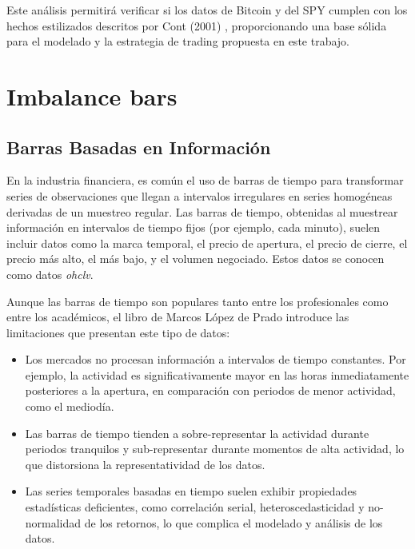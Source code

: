 \documentclass[a4paper,12pt]{report}
\begin{document}

Este análisis permitirá verificar si los datos de Bitcoin y del SPY cumplen con los hechos estilizados 
descritos por Cont (2001) \cite{Cont2001}, proporcionando una base sólida para el modelado y la estrategia 
de trading propuesta en este trabajo.

\chapter{Imbalance bars}

\section{Barras Basadas en Información}

En la industria financiera, es común el uso de barras de tiempo para transformar 
series de observaciones que llegan a intervalos irregulares en series homogéneas 
derivadas de un muestreo regular. Las barras de tiempo, obtenidas al muestrear 
información en intervalos de tiempo fijos (por ejemplo, cada minuto), suelen incluir 
datos como la marca temporal, el precio de apertura, el precio de cierre, el precio 
más alto, el más bajo, y el volumen negociado. Estos datos se conocen como datos \textit{ohclv}.

Aunque las barras de tiempo son populares tanto entre los profesionales como entre los académicos, 
el libro de Marcos López de Prado introduce las limitaciones que presentan este tipo de datos:

\begin{itemize}
    \item Los mercados no procesan información a intervalos de tiempo constantes. Por ejemplo, la 
    actividad es significativamente mayor en las horas inmediatamente posteriores a la apertura, 
    en comparación con periodos de menor actividad, como el mediodía.
    \item Las barras de tiempo tienden a sobre-representar la actividad durante periodos tranquilos 
    y sub-representar durante momentos de alta actividad, lo que distorsiona la representatividad de los datos.
    \item Las series temporales basadas en tiempo suelen exhibir propiedades estadísticas deficientes, 
    como correlación serial, heteroscedasticidad y no-normalidad de los retornos, lo que complica el 
    modelado y análisis de los datos.
\end{itemize}
\end{document}

